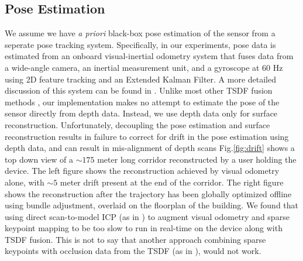 \documentclass[conference]{IEEEtran}
\newcommand{\figref}[1]{Fig.\ref{#1}}
\begin{document}
\subsection{Pose Estimation}
\label{section:pose}
We assume we  have \textit{a priori} black-box pose estimation of the
sensor from a seperate pose tracking system. Specifically, in our experiments,
pose data is estimated from an onboard visual-inertial odometry system that fuses
data from a wide-angle camera, an inertial measurement unit, and a gyroscope at
60 Hz using 2D feature tracking and an Extended Kalman Filter. A more detailed
discussion of this system can be found in \cite{VINS, VINS2}.  Unlike
most other TSDF fusion methods \cite{Newcombe, Whelan2013,
Bylow2013, NiessnerHashing} , our implementation makes no attempt to estimate
the pose of the sensor directly from depth data. Instead, we use depth data 
only for surface reconstruction. Unfortunately, decoupling the pose estimation
and surface reconstruction results in failure to correct for drift in the pose
estimation using depth data, and can result in mis-alignment of depth scans
\figref{fig:drift} shows a top down view of a $\sim
175$ meter long corridor reconstructed by a user holding the device. The
left figure shows the reconstruction achieved by visual odometry alone,
with $\sim 5$ meter drift present at the end of the corridor. The right 
figure shows the reconstruction after the trajectory has been globally
optimized offline using bundle adjustment, overlaid on the floorplan of
 the building. We found that using direct scan-to-model ICP (as in
 \cite{Newcombe}) to augment visual odometry and sparse keypoint mapping to be
 too slow to run in real-time on the device along with TSDF fusion. This is not
 to say that another approach combining sparse keypoints with occlusion data
 from the TSDF (as in \cite{StuecklerSparseDense}), would not work.
\end{document}
